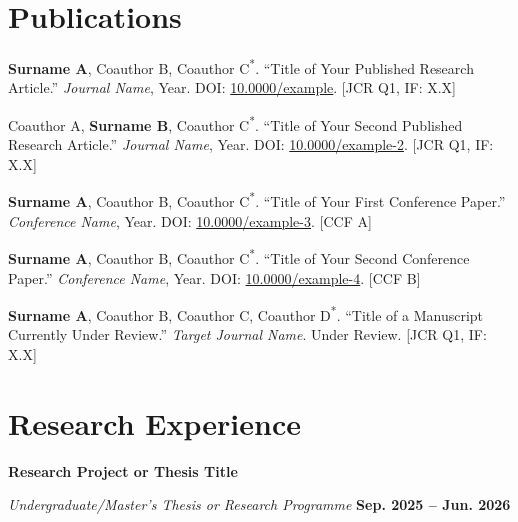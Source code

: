 \documentclass[11pt,a4paper]{article}
\newcommand{\daterange}[1]{{\textbf{#1}}}
\newcommand{\entrytitle}[1]{{\textbf{#1}}}
\begin{document}
\section*{Publications}
\vspace{-0.1em}

\begin{enumerate}[label={[\arabic*]}, labelindent=0pt, leftmargin=*, labelsep=0.45em,
                  topsep=0.15em, itemsep=0pt, parsep=0pt]
    \item \textbf{Surname A}, Coauthor B, Coauthor C\textsuperscript{*}. ``Title of Your Published Research Article.'' \textit{Journal Name}, Year. DOI: \href{https://doi.org/10.0000/example}{10.0000/example}. [JCR Q1, IF: X.X]

    \item Coauthor A, \textbf{Surname B}, Coauthor C\textsuperscript{*}. ``Title of Your Second Published Research Article.'' \textit{Journal Name}, Year. DOI: \href{https://doi.org/10.0000/example-2}{10.0000/example-2}. [JCR Q1, IF: X.X]

    \item \textbf{Surname A}, Coauthor B, Coauthor C\textsuperscript{*}. ``Title of Your First Conference Paper.'' \textit{Conference Name}, Year. DOI: \href{https://doi.org/10.0000/example-3}{10.0000/example-3}. [CCF A]

    \item \textbf{Surname A}, Coauthor B, Coauthor C\textsuperscript{*}. ``Title of Your Second Conference Paper.'' \textit{Conference Name}, Year. DOI: \href{https://doi.org/10.0000/example-4}{10.0000/example-4}. [CCF B]

    \item \textbf{Surname A}, Coauthor B, Coauthor C, Coauthor D\textsuperscript{*}. ``Title of a Manuscript Currently Under Review.'' \textit{Target Journal Name}. Under Review. [JCR Q1, IF: X.X]
\end{enumerate}

\section*{Research Experience}
\vspace{-0.1em}

\noindent
\entrytitle{Research Project or Thesis Title}

\par\noindent
\textit{Undergraduate/Master's Thesis or Research Programme}
\hfill \daterange{Sep. 2025 -- Jun. 2026}
\end{document}
